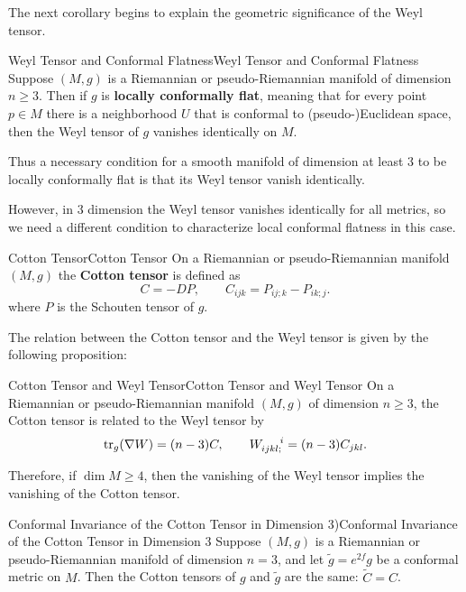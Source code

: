 \documentclass[../main.tex]{subfiles}
\begin{document}
The next corollary begins to explain the geometric significance of the Weyl tensor.

\begin{corollary}{Weyl Tensor and Conformal Flatness}{Weyl Tensor and Conformal Flatness}
	Suppose $(M, g)$ is a Riemannian or pseudo-Riemannian manifold of dimension $n \geq 3$. Then if $g$ is \textbf{locally conformally flat}, meaning that for every point $p \in M$ there is a neighborhood $U$ that is conformal to (pseudo-)Euclidean space, then the Weyl tensor of $g$ vanishes identically on $M$.
\end{corollary}

Thus a necessary condition for a smooth manifold of dimension at least 3 to be locally conformally flat is that its Weyl tensor vanish identically.

However, in 3 dimension the Weyl tensor vanishes identically for all metrics, so we need a different condition to characterize local conformal flatness in this case.

\begin{definition}{Cotton Tensor}{Cotton Tensor}
	On a Riemannian or pseudo-Riemannian manifold $(M, g)$ the \textbf{Cotton tensor} is defined as
	\begin{equation}
		C = -D P, \qquad C_{ijk} = P_{ij;k} - P_{ik;j}.
	\end{equation}
	where $P$ is the Schouten tensor of $g$.
\end{definition}

The relation between the Cotton tensor and the Weyl tensor is given by the following proposition:
\begin{proposition}{Cotton Tensor and Weyl Tensor}{Cotton Tensor and Weyl Tensor}
	On a Riemannian or pseudo-Riemannian manifold $(M, g)$ of dimension $n \geq 3$, the Cotton tensor is related to the Weyl tensor by
	\begin{equation}
		\tr_g(\nabla W) = (n-3) C, \qquad W_{ijkl;}^{\ \ \ \ i} = (n-3) C_{jkl}.
	\end{equation}
\end{proposition}

Therefore, if $\dim M \geq 4$, then the vanishing of the Weyl tensor implies the vanishing of the Cotton tensor.

\begin{proposition}{Conformal Invariance of the Cotton Tensor in Dimension 3)}{Conformal Invariance of the Cotton Tensor in Dimension 3}
	Suppose $(M, g)$ is a Riemannian or pseudo-Riemannian manifold of dimension $n = 3$, and let $\tilde{g} = e^{2f} g$ be a conformal metric on $M$. Then the Cotton tensors of $g$ and $\tilde{g}$ are the same: $\tilde{C} = C$.
\end{proposition}
\end{document}
